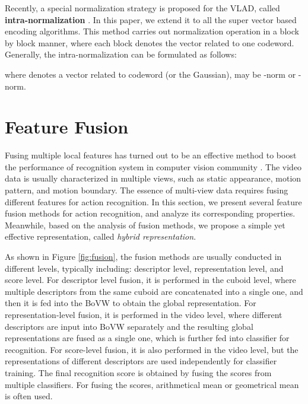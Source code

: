 \documentclass[twocolumn]{svjour3}          \smartqed  \usepackage{slashbox}
\begin{document}
Recently, a special normalization strategy is proposed for the VLAD, called \textbf{intra-normalization} \cite{ArandjelovicZ13}. In this paper, we extend it to all the super vector based encoding algorithms. This method carries out normalization operation in a block by block manner, where each block denotes the vector related to one codeword. Generally, the intra-normalization can be formulated as follows:

where  denotes a vector related to codeword  (or the  Gaussian),  may be -norm or -norm.


\section{Feature Fusion}
\label{sec:fusion}
Fusing multiple local features has turned out to be an effective method to boost the performance of recognition system in computer vision community \cite{GehlerN09,VedaldiGVZ09,TangYLK13,WangS13a,CaiWPQ14}. The video data is usually characterized in multiple views, such as static appearance, motion pattern, and motion boundary. The essence of multi-view data requires fusing different features for action recognition. In this section, we present several feature fusion methods for action recognition, and analyze its corresponding properties. Meanwhile, based on the analysis of fusion methods, we propose a simple yet effective representation, called \emph{hybrid representation}.

As shown in Figure \ref{fig:fusion}, the fusion methods are usually conducted in different levels, typically including: descriptor level, representation level, and score level. For descriptor level fusion, it is performed in the cuboid level, where multiple descriptors from the same cuboid are concatenated into a single one, and then it is fed into the BoVW to obtain the global representation. For representation-level fusion, it is performed in the video level, where different descriptors are input into BoVW separately and the resulting global representations are fused as a single one, which is further fed into classifier for recognition. For score-level fusion, it is also performed in the video level, but the representations of different descriptors are used independently for classifier training. The final recognition score is obtained by fusing the scores from multiple classifiers. For fusing the scores, arithmetical mean or geometrical mean is often used.
\end{document}
